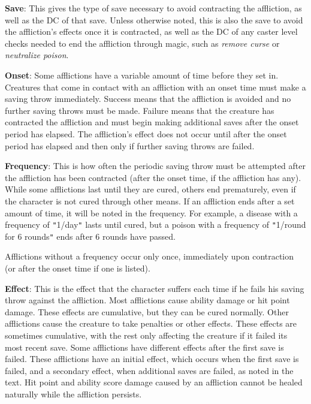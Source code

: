 \textbf{Save}: This gives the type of save necessary to avoid contracting the affliction, as well as the DC of that save. Unless otherwise noted, this is also the save to avoid the affliction's effects once it is contracted, as well as the DC of any caster level checks needed to end the affliction through magic, such as \textit{remove curse} or \textit{neutralize poison}.
				
\textbf{Onset}: Some afflictions have a variable amount of time before they set in. Creatures that come in contact with an affliction with an onset time must make a saving throw immediately. Success means that the affliction is avoided and no further saving throws must be made. Failure means that the creature has contracted the affliction and must begin making additional saves after the onset period has elapsed. The affliction's effect does not occur until after the onset period has elapsed and then only if further saving throws are failed.
				
\textbf{Frequency}: This is how often the periodic saving throw must be attempted after the affliction has been contracted (after the onset time, if the affliction has any). While some afflictions last until they are cured, others end prematurely, even if the character is not cured through other means. If an affliction ends after a set amount of time, it will be noted in the frequency. For example, a disease with a frequency of \texttt{{}"{}}1/day\texttt{{}"{}} lasts until cured, but a poison with a frequency of \texttt{{}"{}}1/round for 6 rounds\texttt{{}"{}} ends after 6 rounds have passed.
				
Afflictions without a frequency occur only once, immediately upon contraction (or after the onset time if one is listed). 
				
\textbf{Effect}: This is the effect that the character suffers each time if he fails his saving throw against the affliction. Most afflictions cause ability damage or hit point damage. These effects are cumulative, but they can be cured normally. Other afflictions cause the creature to take penalties or other effects. These effects are sometimes cumulative, with the rest only affecting the creature if it failed its most recent save. Some afflictions have different effects after the first save is failed. These afflictions have an initial effect, which occurs when the first save is failed, and a secondary effect, when additional saves are failed, as noted in the text. Hit point and ability score damage caused by an affliction cannot be healed naturally while the affliction persists.
				
